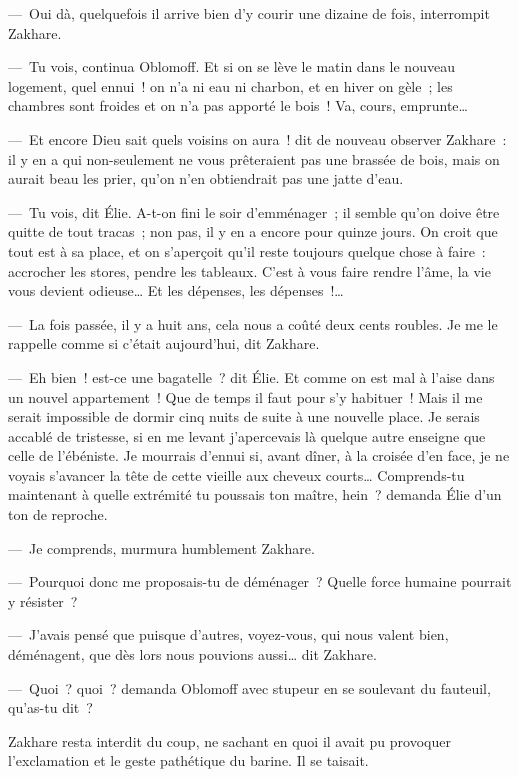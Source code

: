 \documentclass[french,twoside]{book} %
\begin{document}
— Oui dà, quelquefois il arrive bien d’y courir une dizaine de fois, interrompit Zakhare.\par
— Tu vois, continua Oblomoff. Et si on se lève le matin dans le nouveau logement, quel ennui ! on n’a ni eau ni charbon, et en hiver on gèle ; les chambres sont froides et on n’a pas apporté le bois ! Va, cours, emprunte…\par
— Et encore Dieu sait quels voisins on aura ! dit de nouveau observer Zakhare : il y en a qui non-seulement ne vous prêteraient pas une brassée de bois, mais on aurait beau les prier, qu’on n’en obtiendrait pas une jatte d’eau.\par
— Tu vois, dit Élie. A-t-on fini le soir d’emménager ; il semble qu’on doive être quitte de tout tracas ; non pas, il y en a encore pour quinze jours. On croit que tout est à sa place, et on s’aperçoit qu’il reste toujours quelque chose à faire : accrocher les stores, pendre les tableaux. C’est à vous faire rendre l’âme, la vie vous devient odieuse… Et les dépenses, les dépenses !…\par
— La fois passée, il y a huit ans, cela nous a coûté deux cents roubles. Je me le rappelle comme si c’était aujourd’hui, dit Zakhare.\par
— Eh bien ! est-ce une bagatelle ? dit Élie. Et comme on est mal à l’aise dans un nouvel appartement ! Que de temps il faut pour s’y habituer ! Mais il me serait impossible de dormir cinq nuits de suite à une nouvelle place. Je serais accablé de tristesse, si en me levant j’apercevais là quelque autre enseigne que celle de l’ébéniste. Je mourrais d’ennui si, avant dîner, à la croisée d’en face, je ne voyais s’avancer la tête de cette vieille aux cheveux courts… Comprends-tu maintenant à quelle extrémité tu poussais ton maître, hein ? demanda Élie d’un ton de reproche.\par
— Je comprends, murmura humblement Zakhare.\par
— Pourquoi donc me proposais-tu de déménager ? Quelle force humaine pourrait y résister ?\par
— J’avais pensé que puisque d’autres, voyez-vous, qui nous valent bien, déménagent, que dès lors nous pouvions aussi… dit Zakhare.\par
— Quoi ? quoi ? demanda Oblomoff avec stupeur en se soulevant du fauteuil, qu’as-tu dit ?\par
Zakhare resta interdit du coup, ne sachant en quoi il avait pu provoquer l’exclamation et le geste pathétique du barine. Il se taisait.\par
\end{document}
